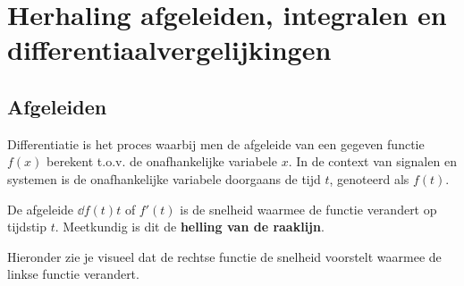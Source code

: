 \chapter{Herhaling afgeleiden, integralen en differentiaalvergelijkingen}
\label{ch:herhaling_afgeleiden_en_integralen}


\section{Afgeleiden}

\begin{conceptbox}[Differentiatie]
Differentiatie is het proces waarbij men de afgeleide van een gegeven functie $f(x)$ berekent t.o.v. 
de onafhankelijke variabele $x$. 
In de context van signalen en systemen is de onafhankelijke variabele doorgaans de tijd $t$, genoteerd als $f(t)$.

De afgeleide $\dd{f(t)}{t}$ of $f'(t)$ is de snelheid waarmee de functie verandert op tijdstip $t$. Meetkundig is 
dit de \textbf{helling van de raaklijn}.
\end{conceptbox}

Hieronder zie je visueel dat de rechtse functie de snelheid voorstelt waarmee de linkse functie verandert.

\begin{center}
\begin{minipage}{0.45\textwidth}
\centering
{}
\end{minipage}
\hfill
\begin{minipage}{0.45\textwidth}
\centering
{}
\end{minipage}
\end{center}

